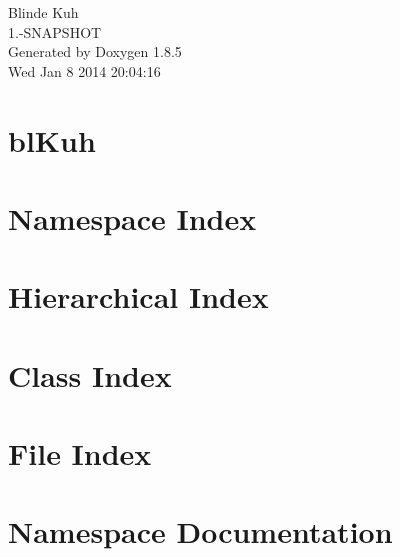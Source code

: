 \documentclass[twoside]{book}
\newcommand{\clearemptydoublepage}{%
  \newpage{\pagestyle{empty}\cleardoublepage}%
}
\begin{document}
\hypersetup{pageanchor=false}
\begin{titlepage}
\vspace*{7cm}
\begin{center}%
{\Large Blinde Kuh \\[1ex]\large 1.-\/\-S\-N\-A\-P\-S\-H\-O\-T }\\
\vspace*{1cm}
{\large Generated by Doxygen 1.8.5}\\
\vspace*{0.5cm}
{\small Wed Jan 8 2014 20:04:16}\\
\end{center}
\end{titlepage}
\clearemptydoublepage
\tableofcontents
\clearemptydoublepage
{}
\hypersetup{pageanchor=true}

\chapter{bl\-Kuh}
\label{md__d_1_projects_bl_kuh__r_e_a_d_m_e}
\hypertarget{md__d_1_projects_bl_kuh__r_e_a_d_m_e}{}

\chapter{Namespace Index}

\chapter{Hierarchical Index}

\chapter{Class Index}

\chapter{File Index}

\chapter{Namespace Documentation}











\end{document}
